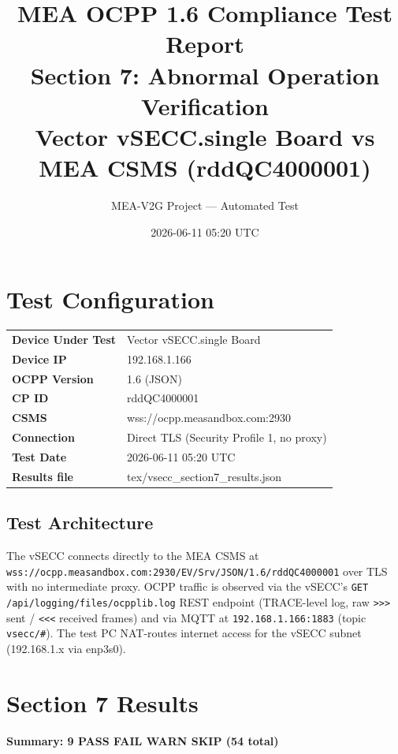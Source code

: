 \documentclass[10pt, a4paper]{article}
\title{\textbf{MEA OCPP 1.6 Compliance Test Report}\\[0.3em]
\large Section 7: Abnormal Operation Verification\\[0.3em]
\normalsize Vector vSECC.single Board vs MEA CSMS (rddQC4000001)}
\author{MEA-V2G Project --- Automated Test}
\date{2026-06-11 05:20 UTC}
\begin{document}
\maketitle
\tableofcontents
\newpage

\section{Test Configuration}
\begin{tabular}{ll}
\textbf{Device Under Test} & Vector vSECC.single Board \\
\textbf{Device IP}         & 192.168.1.166 \\
\textbf{OCPP Version}      & 1.6 (JSON) \\
\textbf{CP ID}             & rddQC4000001 \\
\textbf{CSMS}              & wss://ocpp.measandbox.com:2930 \\
\textbf{Connection}        & Direct TLS (Security Profile 1, no proxy) \\
\textbf{Test Date}         & 2026-06-11 05:20 UTC \\
\textbf{Results file}      & tex/vsecc\_section7\_results.json \\
\end{tabular}

\subsection*{Test Architecture}
The vSECC connects directly to the MEA CSMS at
\texttt{wss://ocpp.measandbox.com:2930/EV/Srv/JSON/1.6/rddQC4000001}
over TLS with no intermediate proxy.
OCPP traffic is observed via the vSECC's \texttt{GET /api/logging/files/ocpplib.log}
REST endpoint (TRACE-level log, raw \texttt{>>>} sent / \texttt{<<<} received frames)
and via MQTT at \texttt{192.168.1.166:1883} (topic \texttt{vsecc/\#}).
The test PC NAT-routes internet access for the vSECC subnet (192.168.1.x via enp3s0).

\section{Section 7 Results}
\textbf{Summary: 9 PASS  FAIL  WARN  SKIP \quad (54 total)}
\end{document}
